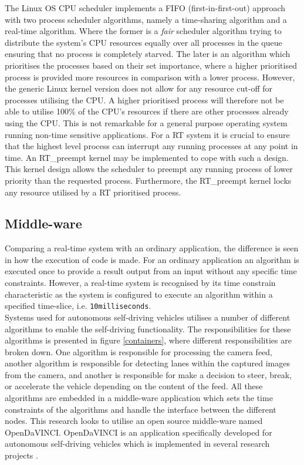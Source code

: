 The Linux OS CPU scheduler implements a FIFO (first-in-first-out) approach with two process scheduler algorithms, namely a time-sharing algorithm and a real-time algorithm. Where the former is a \textit{fair} scheduler algorithm trying to distribute the system's CPU resources equally over all processes in the queue ensuring that no process is completely starved. The later is an algorithm which prioritises the processes based on their set importance, where a higher prioritised process is provided more resources in comparison with a lower process. However, the generic Linux kernel version does not allow for any resource cut-off for processes utilising the CPU. A higher prioritised process will therefore not be able to utilise 100\% of the CPU's resources if there are other processes already using the CPU. This is not remarkable for a general purpose operating system running non-time sensitive applications. For a RT system it is crucial to ensure that the highest level process can interrupt any running processes at any point in time. An RT\_preempt kernel may be implemented to cope with such a design. This kernel design allows the scheduler to preempt any running process of lower priority than the requested process. Furthermore, the RT\_preempt kernel locks any resource utilised by a RT prioritised process.

\subsection{Middle-ware}

Comparing a real-time system with an ordinary application, the difference is seen in how the execution of code is made. For an ordinary application an algorithm is executed once to provide a result output from an input without any specific time constraints. However, a real-time system is recognised by its time constrain characteristic as the system is configured to execute an algorithm within a specified time-slice, i.e. \texttt{10milliseconds}.\\

Systems used for autonomous self-driving vehicles utilises a number of different algorithms to enable the self-driving functionality. The responsibilities for these algorithms is presented in figure \ref{containers}, where different responsibilities are broken down. One algorithm is responsible for processing the camera feed, another algorithm is responsible for detecting lanes within the captured images from the camera, and another is responsible for make a decision to steer, break, or accelerate the vehicle depending on the content of the feed. All these algorithms are embedded in a middle-ware application which sets the time constraints of the algorithms and handle the interface between the different nodes. This research looks to utilise an open source middle-ware named OpenDaVINCI. OpenDaVINCI is an application specifically developed for autonomous self-driving vehicles which is implemented in several research projects \cite{OpenDaVINCI}.

